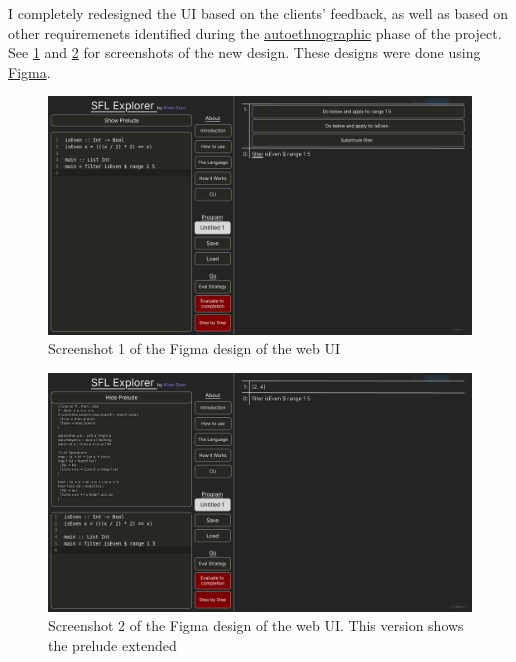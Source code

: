 I completely redesigned the UI based on the clients' feedback, as well as based on other requiremenets identified during the \hyperref[sec:c1_autoethnography]{autoethnographic} phase of the project.  See \ref{fig:screenshot_figma1} and \ref{fig:screenshot_figma2} for screenshots of the new design. These designs were done using \href{https://figma.com}{Figma}. 

\begin{figure}[h]
    \centering
    \includegraphics[width=1\linewidth]{images/figma_1.png} 
    \captionsetup{justification=centering}
    \caption{Screenshot 1 of the Figma design of the web UI}
    \label{fig:screenshot_figma1}
\end{figure}

\begin{figure}[h]
    \centering
    \includegraphics[width=1\linewidth]{images/figma_2.png}
    \captionsetup{justification=centering}
    \caption{Screenshot 2 of the Figma design of the web UI. This version shows the prelude extended}
    \label{fig:screenshot_figma2}
\end{figure}

